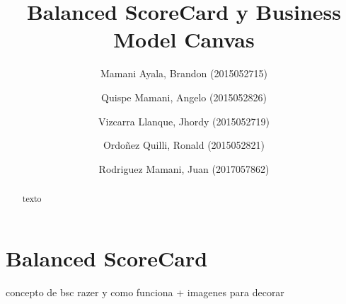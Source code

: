 \documentclass[preprint,12pt]{elsarticle}
\begin{document}
	
	\begin{frontmatter}
		
		
		\title{\huge Balanced ScoreCard y Business Model Canvas}
		
		\author{Mamani Ayala, Brandon        (2015052715)}
		\author{Quispe Mamani, Angelo	      (2015052826)}
		\author{Vizcarra Llanque, Jhordy	      (2015052719)}
		\author{Ordoñez Quilli, Ronald          (2015052821)}
		\author{Rodriguez Mamani, Juan      (2017057862)}
		
		\address{Tacna, Perú}
		
		\begin{abstract}
			texto
	
		\end{abstract}
\end{frontmatter}

	
	
	
	



\section{Balanced ScoreCard }

concepto de bsc razer y como funciona + imagenes para decorar\\
\end{document}
